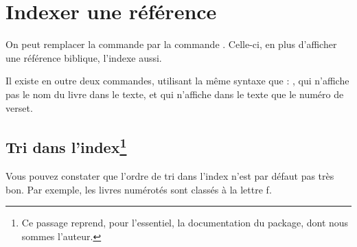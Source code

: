 \section{Indexer une référence}

On peut remplacer la commande  par la commande . Celle-ci, en plus d'afficher une référence biblique, l'indexe aussi.

Il existe en outre deux commandes, utilisant la même syntaxe que  : , qui n'affiche pas le nom du livre dans le texte, et  qui n'affiche dans le texte que le numéro de verset.

\subsection[Tri dans l'index]{Tri dans l'index\footnote{Ce passage reprend, pour l'essentiel, la documentation du package, dont nous sommes l'auteur.}}

Vous pouvez constater que l'ordre de tri dans l'index n'est par défaut pas très bon. Par exemple, les livres numérotés sont classés à la lettre ƒ. 

